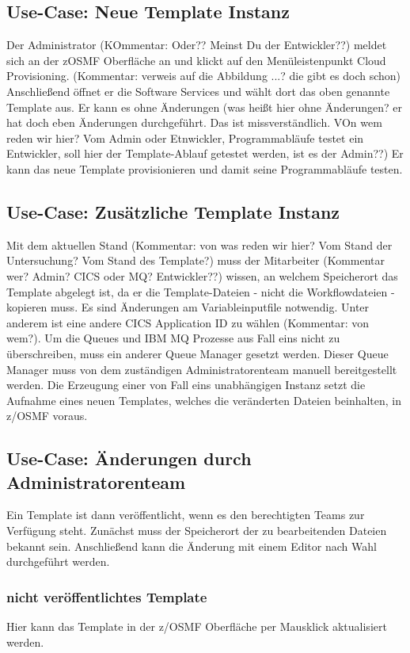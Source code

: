 \subsection{Use-Case: Neue Template Instanz}
Der Administrator (KOmmentar: Oder?? Meinst Du der Entwickler??) meldet sich an der zOSMF Oberfläche an und klickt auf den Menüleistenpunkt \glqq Cloud Provisioning\grqq. (Kommentar: verweis auf die Abbildung ...? die gibt es doch schon)
Anschließend öffnet er die \glqq Software Services\grqq{} und wählt dort das oben genannte Template aus.
Er kann es ohne Änderungen  (was heißt hier ohne Änderungen? er hat doch eben Änderungen durchgeführt. Das ist missverständlich. VOn wem reden wir hier? Vom Admin oder Etnwickler, Programmabläufe testet ein Entwickler, soll hier der Template-Ablauf getestet werden, ist es der Admin??)  Er kann das neue Template provisionieren und damit seine Programmabläufe testen.

\subsection{Use-Case: Zusätzliche Template Instanz}\label{ssec:akttemp2fall}
Mit dem aktuellen Stand (Kommentar: von was reden wir hier? Vom Stand der Untersuchung? Vom Stand des Template?)  muss der Mitarbeiter (Kommentar wer? Admin?  CICS oder MQ? Entwickler??) wissen, an welchem Speicherort das Template abgelegt ist, da er die Template-Dateien - nicht die Workflowdateien - kopieren muss.
Es sind Änderungen am Variableinputfile notwendig.
Unter anderem ist eine andere CICS Application ID zu wählen (Kommentar: von wem?).
Um die Queues und IBM MQ Prozesse aus Fall eins nicht zu überschreiben, muss  ein anderer Queue Manager gesetzt werden.
Dieser Queue Manager muss von dem zuständigen Administratorenteam manuell bereitgestellt werden.
Die Erzeugung einer von Fall eins unabhängigen Instanz setzt die Aufnahme eines neuen Templates, welches die veränderten Dateien beinhalten, in z/OSMF voraus.

\subsection{Use-Case: Änderungen durch Administratorenteam}
Ein Template ist dann veröffentlicht, wenn es den berechtigten Teams zur Verfügung steht.
Zunächst muss der Speicherort der zu bearbeitenden Dateien bekannt sein.
Anschließend kann die Änderung mit einem Editor nach Wahl durchgeführt werden.

\subsubsection{nicht veröffentlichtes Template}
Hier kann das Template in der z/OSMF Oberfläche per Mausklick aktualisiert werden.

